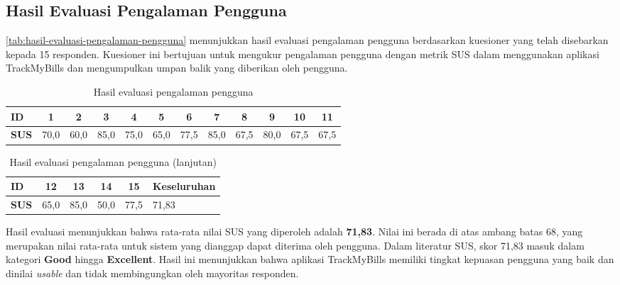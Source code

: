 \subsection{Hasil Evaluasi Pengalaman Pengguna}
\label{subsec:hasil-evaluasi-pengalaman-pengguna}

\autoref{tab:hasil-evaluasi-pengalaman-pengguna} menunjukkan hasil evaluasi pengalaman pengguna berdasarkan kuesioner yang telah disebarkan kepada 15 responden. Kuesioner ini bertujuan untuk mengukur pengalaman pengguna dengan metrik SUS dalam menggunakan aplikasi TrackMyBills dan mengumpulkan umpan balik yang diberikan oleh pengguna. 

\begin{table}[h!]
\centering
\caption{Hasil evaluasi pengalaman pengguna}
\label{tab:hasil-evaluasi-pengalaman-pengguna}
\begin{tabularx}{\linewidth}{|l|*{11}{c|}}
\hline
\textbf{ID} & 1 & 2 & 3 & 4 & 5 & 6 & 7 & 8 & 9 & 10 & 11 \\ \hline
\textbf{SUS} & 70,0 & 60,0 & 85,0 & 75,0 & 65,0 & 77,5 & 85,0 & 67,5 & 80,0 & 67,5 & 67,5 \\ \hline
\end{tabularx}
\end{table}

\begin{table}[h!]
    \ContinuedFloat
\centering
\caption{Hasil evaluasi pengalaman pengguna (lanjutan)}
\begin{tabular}{|l|*{4}{c|}l|}
\hline
\textbf{ID} & 12 & 13 & 14 & 15 & Keseluruhan \\ \hline
\textbf{SUS} & 65,0 & 85,0 & 50,0 & 77,5 & 71,83 \\ \hline
\end{tabular}
\end{table}

Hasil evaluasi menunjukkan bahwa rata-rata nilai SUS yang diperoleh adalah \textbf{71,83}. Nilai ini berada di atas ambang batas 68, yang merupakan nilai rata-rata untuk sistem yang dianggap dapat diterima oleh pengguna. Dalam literatur SUS, skor 71,83 masuk dalam kategori \textbf{Good} hingga \textbf{Excellent}. Hasil ini menunjukkan bahwa aplikasi TrackMyBills memiliki tingkat kepuasan pengguna yang baik dan dinilai \emph{usable} dan tidak membingungkan oleh mayoritas responden.
